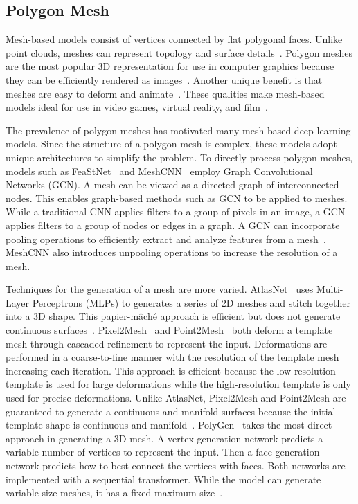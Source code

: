 \subsection{Polygon Mesh}
\label{Polygon Mesh}

Mesh-based models consist of vertices connected by flat polygonal faces. Unlike point clouds, meshes can represent topology and surface details~\cite{Xiao2020}. Polygon meshes are the most popular 3D representation for use in computer graphics because they can be efficiently rendered as images~\cite{Watt1996}. Another unique benefit is that meshes are easy to deform and animate~\cite{Wang2018}. These qualities make mesh-based models ideal for use in video games, virtual reality, and film~\cite{Nash2020}.

The prevalence of polygon meshes has motivated many mesh-based deep learning models. Since the structure of a polygon mesh is complex, these models adopt unique architectures to simplify the problem. To directly process polygon meshes, models such as FeaStNet~\cite{Verma2018} and MeshCNN~\cite{Hanocka2019} employ Graph Convolutional Networks (GCN). A mesh can be viewed as a directed graph of interconnected nodes. This enables graph-based methods such as GCN to be applied to meshes. While a traditional CNN applies filters to a group of pixels in an image, a GCN applies filters to a group of nodes or edges in a graph. A GCN can incorporate pooling operations to efficiently extract and analyze features from a mesh~\cite{Verma2018}. MeshCNN also introduces unpooling operations to increase the resolution of a mesh.

Techniques for the generation of a mesh are more varied. AtlasNet~\cite{Groueix2018} uses Multi-Layer Perceptrons (MLPs) to generates a series of 2D meshes and stitch together into a 3D shape. This papier-m\^{a}ch\'{e} approach is efficient but does not generate continuous surfaces~\cite{Groueix2018}. Pixel2Mesh~\cite{Wang2018} and Point2Mesh~\cite{Hanocka2020} both deform a template mesh through cascaded refinement to represent the input. Deformations are performed in a coarse-to-fine manner with the resolution of the template mesh increasing each iteration. This approach is efficient because the low-resolution template is used for large deformations while the high-resolution template is only used for precise deformations. Unlike AtlasNet, Pixel2Mesh and Point2Mesh are guaranteed to generate a continuous and manifold surfaces because the initial template shape is continuous and manifold~\cite{Wang2018, Hanocka2020}. PolyGen~\cite{Nash2020} takes the most direct approach in generating a 3D mesh. A vertex generation network predicts a variable number of vertices to represent the input. Then a face generation network predicts how to best connect the vertices with faces. Both networks are implemented with a sequential transformer. While the model can generate variable size meshes, it has a fixed maximum size~\cite{Nash2020}.


